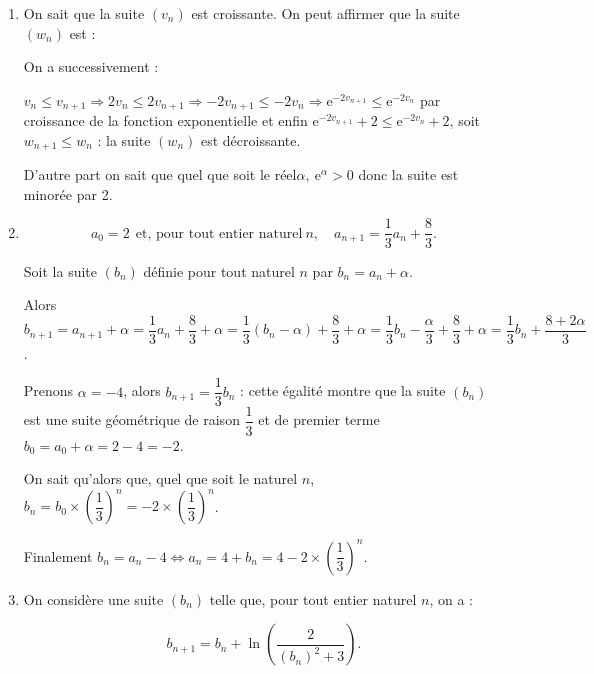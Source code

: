 \documentclass[10pt]{article}
\providecommand{\e}{{\mathrm{e}}}
\begin{document}
\begin{enumerate}[resume]
\item On sait que la suite $\left(v_n\right)$ est croissante. On peut affirmer que la suite $\left(w_n\right)$ est :







On a successivement :

$v_n \leqslant v_{n+1} \Rightarrow 2v_n \leqslant 2v_{n+1} \Rightarrow - 2v_{n+1} \leqslant - 2v_n\Rightarrow \e^{- 2v_{n+1}} \leqslant \e^{- 2v_n}$ par croissance de la fonction exponentielle et enfin $\e^{- 2v_{n+1}} + 2 \leqslant \e^{- 2v_n} + 2$, soit $w_{n+1} \leqslant w_n$ : la suite $\left(w_n\right)$ est décroissante.

D'autre part on sait que quel que soit le réel$\alpha, \: \e^{\alpha} > 0$ donc  la suite est minorée par 2.
\item 

\[a_0 = 2 \:\:\text{et, pour tout entier naturel}\: n, \quad a_{n+1} = \dfrac13a_n + \dfrac83.\]








Soit la suite $\left(b_n\right)$ définie pour tout naturel $n$ par $b_n = a_n + \alpha$.

Alors $b_{n+1} = a_{n+1} + \alpha = \dfrac13a_n + \dfrac83 + \alpha = \dfrac13\left(b_n - \alpha \right) + \dfrac83 + \alpha = \dfrac13b_n - \dfrac{\alpha}{3} + \dfrac83 + \alpha = \dfrac13b_n + \dfrac{8 + 2\alpha}{3}$.

Prenons $\alpha = - 4$, alors $b_{n+1} = \dfrac13b_n$ : cette égalité montre que la suite $\left(b_n\right)$ est une suite géométrique de raison $\dfrac13$ et de premier terme $b_0 = a_0 + \alpha = 2 - 4 = - 2$.

On sait qu'alors que, quel que soit le naturel $n$, \: $b_n = b_0 \times \left(\dfrac{1}{3}\right)^n = - 2 \times \left(\dfrac{1}{3}\right)^n$.

Finalement $b_n = a_n - 4 \iff a_n = 4 + b_n = 4 - 2\times \left(\dfrac{1}{3}\right)^n$.
\item On considère une suite $\left(b_n\right)$ telle que, pour tout entier naturel $n$, on a :

\[b_{n+1} = b_n + \ln \left(\dfrac{2}{\left(b_n \right)^2 + 3}\right).\]










\end{enumerate}
\end{document}
